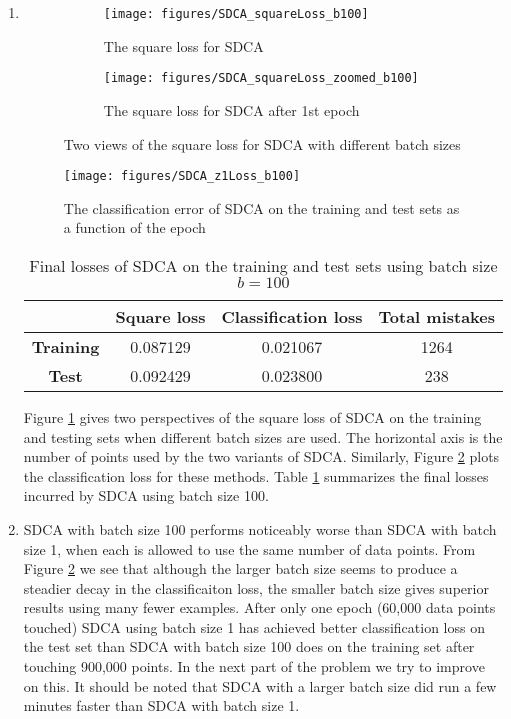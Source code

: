 \documentclass{article}
\begin{document}
\begin{enumerate}
	\item
	\begin{figure}
		\centering
		\begin{subfigure}{0.49\textwidth}
			\centering
			\texttt{[image: figures/SDCA\_squareLoss\_b100]}
			\caption{The square loss for SDCA}
		\end{subfigure}
		\begin{subfigure}{0.49\textwidth}
			\centering
			\texttt{[image: figures/SDCA\_squareLoss\_zoomed\_b100]}
			\caption{The square loss for SDCA after 1st epoch}
		\end{subfigure}
		\caption{Two views of the square loss for SDCA with different batch sizes} 
		\label{fig:SDCA_squareLoss_b100}
	\end{figure}

	\begin{figure}
		\centering
		\texttt{[image: figures/SDCA\_z1Loss\_b100]}
		\caption{The classification error of SDCA on the training and test sets as a function of the epoch} 
		\label{fig:SDCA_z1Loss_b100}
	\end{figure}

	\begin{table}
		\centering
		\begin{tabular}{|c|c|c|c|}\hline
		     & {\bf Square loss} & {\bf Classification loss} & {\bf Total mistakes}  \\ \hline
		     \textbf{Training}	& 0.087129	& 0.021067	 & 1264	\\ \hline
		     \textbf{Test}    	& 0.092429	& 0.023800	 & 238	\\ \hline
		\end{tabular}
		\caption{Final losses of SDCA on the training and test sets using batch size $b=100$}
		\label{tab:SDCA_final_loss_b100}
	\end{table}

	Figure \ref{fig:SDCA_squareLoss_b100} gives two perspectives of the square loss of SDCA on the training and testing sets when different batch sizes are used. The horizontal axis is the number of points used by the two variants of SDCA. Similarly, Figure \ref{fig:SDCA_z1Loss_b100} plots the classification loss for these methods. Table \ref{tab:SDCA_final_loss_b100} summarizes the final losses incurred by SDCA using batch size 100.

	\item SDCA with batch size 100 performs noticeably worse than SDCA with batch size 1, when each is allowed to use the same number of data points. From Figure \ref{fig:SDCA_z1Loss_b100} we see that although the larger batch size seems to produce a steadier decay in the classificaiton loss, the smaller batch size gives superior results using many fewer examples. After only one epoch (60,000 data points touched) SDCA using batch size 1 has achieved better classification loss on the test set than SDCA with batch size 100 does on the training set after touching 900,000 points. In the next part of the problem we try to improve on this. It should be noted that SDCA with a larger batch size did run a few minutes faster than SDCA with batch size 1.
\end{enumerate}
\end{document}
